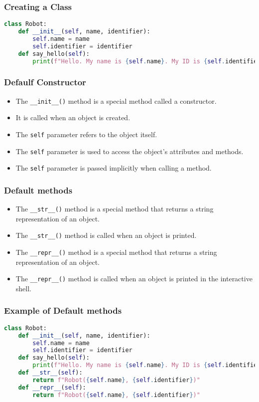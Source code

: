 \begin{frame}[fragile]
    \frametitle{Creating a Class}
    \begin{lstlisting}[style=colorful, language=Python]
class Robot:
    def __init__(self, name, identifier):
        self.name = name
        self.identifier = identifier
    def say_hello(self):
        print(f"Hello. My name is {self.name}. My ID is {self.identifier}.")
    \end{lstlisting}
\end{frame} 

\begin{frame}
\frametitle{Defaulf Constructor}
\begin{itemize}
    \item The \texttt{\_\_init\_\_()} method is a special method called a constructor.
    \item It is called when an object is created.
    \item The \texttt{self} parameter refers to the object itself.
    \item The \texttt{self} parameter is used to access the object's attributes and methods.
    \item The \texttt{self} parameter is passed implicitly when calling a method.
\end{itemize}       
\end{frame}

\begin{frame}
    \frametitle{Default methods}
    \begin{itemize}
        \item The \texttt{\_\_str\_\_()} method is a special method that returns a string representation of an object.
        \item The \texttt{\_\_str\_\_()} method is called when an object is printed.
        \item The \texttt{\_\_repr\_\_()} method is a special method that returns a string representation of an object.
        \item The \texttt{\_\_repr\_\_()} method is called when an object is printed in the interactive shell.
    \end{itemize}   
\end{frame}

\begin{frame}
\frametitle{Example of Default methods}
\begin{lstlisting}[style=colorful, language=Python]
class Robot:
    def __init__(self, name, identifier):
        self.name = name
        self.identifier = identifier
    def say_hello(self):
        print(f"Hello. My name is {self.name}. My ID is {self.identifier}.")
    def __str__(self):
        return f"Robot({self.name}, {self.identifier})"
    def __repr__(self):
        return f"Robot({self.name}, {self.identifier})"
    
\end{lstlisting}
\end{frame}
